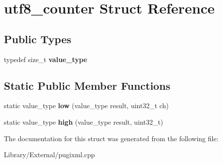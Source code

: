 \hypertarget{structutf8__counter}{}\section{utf8\+\_\+counter Struct Reference}
\label{structutf8__counter}
\subsection*{Public Types}
\begin{DoxyCompactItemize}
\item 
\hypertarget{structutf8__counter_adb65152c007965c42184614da9c4af1b}{}typedef size\+\_\+t {\bfseries value\+\_\+type}\label{structutf8__counter_adb65152c007965c42184614da9c4af1b}

\end{DoxyCompactItemize}
\subsection*{Static Public Member Functions}
\begin{DoxyCompactItemize}
\item 
\hypertarget{structutf8__counter_a0950643189089175ae0eac9b4193534d}{}static value\+\_\+type {\bfseries low} (value\+\_\+type result, uint32\+\_\+t ch)\label{structutf8__counter_a0950643189089175ae0eac9b4193534d}

\item 
\hypertarget{structutf8__counter_ab16e675980a15e1ede2e4cd18d19f7b1}{}static value\+\_\+type {\bfseries high} (value\+\_\+type result, uint32\+\_\+t)\label{structutf8__counter_ab16e675980a15e1ede2e4cd18d19f7b1}

\end{DoxyCompactItemize}


The documentation for this struct was generated from the following file\+:\begin{DoxyCompactItemize}
\item 
Library/\+External/pugixml.\+cpp\end{DoxyCompactItemize}
